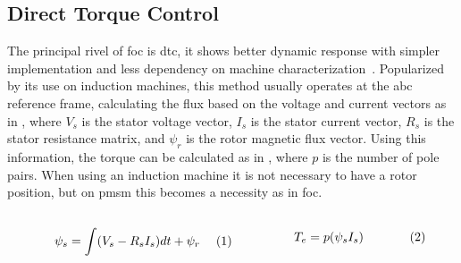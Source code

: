\subsection{Direct Torque Control}
The principal rivel of \gls{foc} is \gls{dtc}, it shows better dynamic response with simpler implementation and less dependency on machine characterization~\cite{Hoang:FOC_vs_DTC_induction:1999}. Popularized by its use on induction machines, this method usually operates at the abc reference frame, calculating the flux based on the voltage and current vectors as in , where $V_s$ is the stator voltage vector, $I_s$ is the stator current vector, $R_s$ is the stator resistance matrix, and $\psi_r$ is the rotor magnetic flux vector. Using this information, the torque can be calculated as in , where $p$ is the number of pole pairs. When using an induction machine it is not necessary to have a rotor position, but on \gls{pmsm} this becomes a necessity as in \gls{foc}.

\begin{subequations}
	\begin{minipage}{.45\linewidth}
        \begin{equation}
            \psi_s = \int (V_s -R_s I_s)dt + \psi_r
            \label{eq:dtc_flux}
        \end{equation}
    \end{minipage}
    \begin{minipage}{.45\linewidth}
        \begin{equation}
            T_e = p(\psi_s I_s)
            \label{eq:dtc_tq}
        \end{equation}
    \end{minipage}
\end{subequations}

